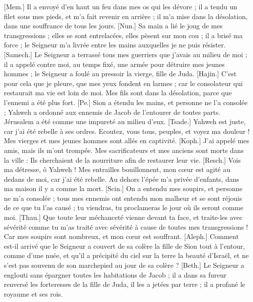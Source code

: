 \begin{multicols}{2}
[Mem.] Il a envoyé d'en haut un feu dans mes os qui les dévore ; il a tendu un filet sous mes pieds, et m'a fait revenir en arrière ; il m'a mise dans la désolation, dans une souffrance de tous les jours.
[Nun.] Sa main a lié le joug de mes transgressions ; elles se sont entrelacées, elles pèsent sur mon cou ;  il a brisé ma force ; le Seigneur m’a livrée entre les mains auxquelles je ne puis résister.
[Samech.] Le Seigneur a terrassé tous mes guerriers que j'avais au milieu de moi ; il a appelé contre moi, au temps fixé, une armée pour détruire mes jeunes hommes ; le Seigneur a foulé au pressoir la vierge, fille de Juda.
[Hajin.] C’est pour cela que je pleure, que mes yeux fondent en larmes ; car le consolateur qui restaurait ma vie est loin de moi.  Mes fils sont dans la désolation, parce que l'ennemi a été plus fort.
[Pe.] Sion a étendu les mains, et personne ne l'a consolée ; Yahweh a ordonné aux ennemis de Jacob de l’entourer de toutes parts. Jérusalem a été comme une impureté au milieu d'eux.
[Tsade.] Yahweh est juste, car j'ai été rebelle à ses ordres. Ecoutez, vous tous, peuples, et voyez ma douleur ! Mes vierges et mes jeunes hommes sont allés en captivité.
[Koph.] J'ai appelé mes amis, mais ils m'ont trompée. Mes sacrificateurs et mes anciens sont morts dans la ville : Ils cherchaient de la nourriture afin de restaurer leur vie.
[Resch.] Vois ma détresse, ô Yahweh ! Mes entrailles bouillonnent, mon cœur est agité au dedans de moi, car j'ai été rebelle. Au dehors l’épée m’a privée d’enfants, dans ma maison il y a comme la mort.
[Scin.] On a entendu mes soupirs, et personne ne m'a consolée ; tous mes ennemis ont entendu mon malheur et se sont réjouis de ce que tu l’as causé ; tu viendras, tu proclameras le jour où ils seront comme moi.
[Thau.] Que toute leur méchanceté vienne devant ta face, et traite-les avec sévérité  comme tu m'as traité avec sévérité à cause de toutes mes transgressions ! Car mes soupirs sont nombreux, et mon cœur est souffrant.
\VerseOne{}[Aleph.] Comment est-il arrivé que le Seigneur a couvert  de sa colère la fille de Sion tout à l’entour, comme d’une nuée, et qu’il a précipité du ciel sur la terre la beauté d’Israël, et ne s’est pas souvenu de son marchepied au jour de sa colère ?
[Beth.] Le Seigneur a englouti sans épargner toutes les habitations de Jacob ; il a dans sa fureur renversé les forteresses de la fille de Juda, il les a jetées par terre ; il a profané le royaume et ses rois.

\end{multicols}
